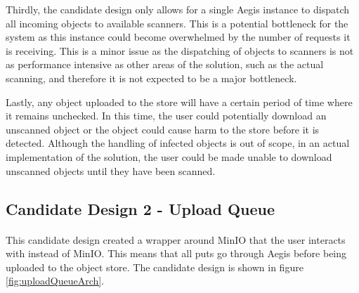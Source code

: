 \documentclass[12pt, conference, final, a4paper, onecolumn, compsoc]{IEEEtran}
\begin{document}
Thirdly, the candidate design only allows for a single Aegis instance to
dispatch all incoming objects to available scanners. This is a potential
bottleneck for the system as this instance could become overwhelmed by the
number of requests it is receiving. This is a minor issue as the dispatching of
objects to scanners is not as performance intensive as other areas of the
solution, such as the actual scanning, and therefore it is not expected to be a
major bottleneck.

Lastly, any object uploaded to the store will have a certain period of time
where it remains unchecked. In this time, the user could potentially download an
unscanned object or the object could cause harm to the store before it is
detected. Although the handling of infected objects is out of scope, in an
actual implementation of the solution, the user could be made unable to download
unscanned objects until they have been scanned.


\subsection*{Candidate Design 2 - Upload Queue}
\paragraph{}

This candidate design created a wrapper around MinIO that the user interacts
with instead of MinIO. This means that all puts go through Aegis before being
uploaded to the object store. The candidate design is shown in figure
\ref{fig:uploadQueueArch}.
\end{document}

